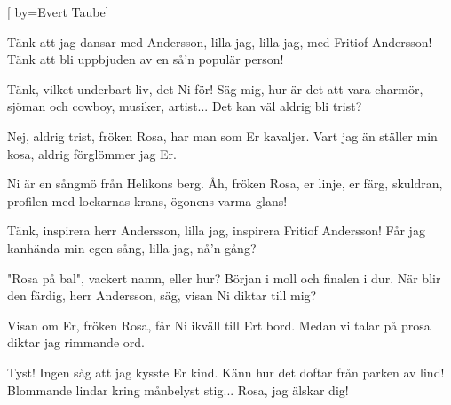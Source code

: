 


[ 	%
	by={Evert Taube}]		%
	
\beginverse*		%
Tänk att jag dansar med Andersson,
lilla jag, lilla jag,
med Fritiof Andersson!
Tänk att bli uppbjuden av en så'n
populär person!
\endverse			%

\beginverse*		%
Tänk, vilket underbart liv, det Ni för!
Säg mig, hur är det att vara charmör,
sjöman och cowboy, musiker, artist...
Det kan väl aldrig bli trist?
\endverse			%

\beginverse*		%
Nej, aldrig trist, fröken Rosa,
har man som Er kavaljer.
Vart jag än ställer min kosa,
aldrig förglömmer jag Er.
\endverse			%

\beginverse*		%
Ni är en sångmö från Helikons berg.
Åh, fröken Rosa, er linje, er färg,
skuldran, profilen med lockarnas krans,
ögonens varma glans!
\endverse			%

\beginverse*		%
Tänk, inspirera herr Andersson,
lilla jag, inspirera Fritiof Andersson!
Får jag kanhända min egen sång,
lilla jag, nå'n gång?
\endverse			%

\beginverse*		%
"Rosa på bal", vackert namn, eller hur?
Början i moll och finalen i dur.
När blir den färdig, herr Andersson, säg,
visan Ni diktar till mig?
\endverse			%

\beginverse*		%
Visan om Er, fröken Rosa,
får Ni ikväll till Ert bord.
Medan vi talar på prosa
diktar jag rimmande ord.
\endverse			%

\beginverse*		%
Tyst! Ingen såg att jag kysste Er kind.
Känn hur det doftar från parken av lind!
Blommande lindar kring månbelyst stig...
Rosa, jag älskar dig!
\endverse			%
\endsong			%

